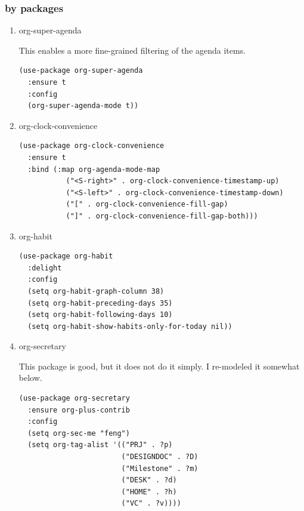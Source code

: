 \documentclass[11pt]{article}
\begin{document}
\subsubsection{by packages}
\label{sec:org454bc3a}
\begin{enumerate}
\item org-super-agenda
\label{sec:org76c6209}

This enables a more fine-grained filtering of the agenda items.

\begin{verbatim}
(use-package org-super-agenda
  :ensure t
  :config
  (org-super-agenda-mode t))
\end{verbatim}
\item org-clock-convenience
\label{sec:org3e61d5b}
\begin{verbatim}
(use-package org-clock-convenience
  :ensure t
  :bind (:map org-agenda-mode-map
           ("<S-right>" . org-clock-convenience-timestamp-up)
           ("<S-left>" . org-clock-convenience-timestamp-down)
           ("[" . org-clock-convenience-fill-gap)
           ("]" . org-clock-convenience-fill-gap-both)))
\end{verbatim}
\item org-habit
\label{sec:orgf7714fc}
\begin{verbatim}
(use-package org-habit
  :delight
  :config
  (setq org-habit-graph-column 38)
  (setq org-habit-preceding-days 35)
  (setq org-habit-following-days 10)
  (setq org-habit-show-habits-only-for-today nil))
\end{verbatim}
\item org-secretary
\label{sec:orgc69d878}

This package is good, but it does not do it simply. I re-modeled it
somewhat below.

\begin{verbatim}
(use-package org-secretary
  :ensure org-plus-contrib
  :config
  (setq org-sec-me "feng")
  (setq org-tag-alist '(("PRJ" . ?p)
                        ("DESIGNDOC" . ?D)
                        ("Milestone" . ?m)
                        ("DESK" . ?d)
                        ("HOME" . ?h)
                        ("VC" . ?v))))
\end{verbatim}


\end{enumerate}
\end{document}
